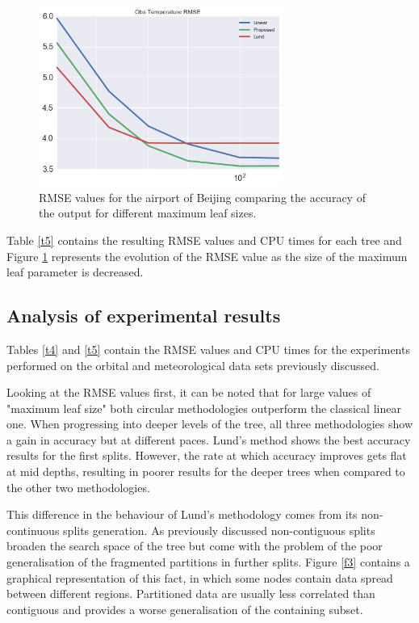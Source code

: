 \documentclass[times,twocolumn,final,authoryear]{elsarticle}
\begin{document}
\begin{figure}
  \includegraphics[width=8cm]{airports_fig.png}
\caption{RMSE values for the airport of Beijing comparing the accuracy of the output for different maximum leaf sizes.}
\label{f_tbn2}
\end{figure}

Table \ref{t5} contains the resulting RMSE values and CPU times for each tree and Figure \ref{f_tbn2} represents the evolution of the RMSE value as the size of the maximum leaf parameter is decreased.

\subsection{Analysis of experimental results}

Tables \ref{t4} and \ref{t5} contain the RMSE values and CPU times for the experiments performed on the orbital and meteorological data sets previously discussed.

Looking at the RMSE values first, it can be noted that for large values of "maximum leaf size" both circular methodologies outperform the classical linear one. When progressing into deeper levels of the tree, all three methodologies show a gain in accuracy but at different paces. Lund's method shows the best accuracy results for the first splits. However, the rate at which accuracy improves gets flat at mid depths, resulting in poorer results for the deeper trees when compared to the other two methodologies. 

This difference in the behaviour of Lund's methodology comes from its non-continuous splits generation. As previously discussed non-contiguous splits broaden the search space of the tree but come with the problem of the poor generalisation of the fragmented partitions in further splits. Figure \ref{f3} contains a graphical representation of this fact, in which some nodes contain data spread between different regions. Partitioned data are usually less correlated than contiguous and provides a worse generalisation of the containing subset. 
\end{document}

